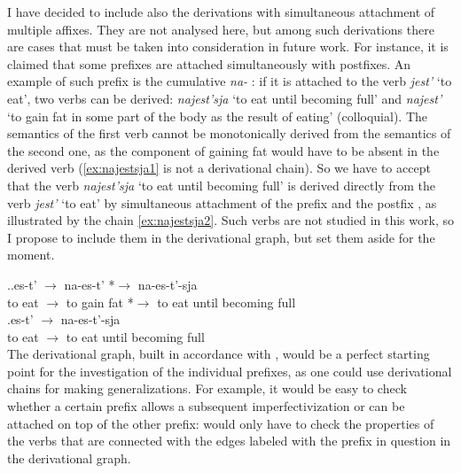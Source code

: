 I have decided to include also the derivations with simultaneous attachment of multiple affixes. They are not analysed here, but among such derivations there are cases that must be taken into consideration in future  work. For instance, it is claimed that some prefixes are attached simultaneously with postfixes. An example of such prefix is the cumulative  \textit{na-}  : if it is attached to the verb \textit{jest'} `to eat', two verbs can be derived: \textit{najest'sja} `to eat until becoming full' and \textit{najest'} `to gain fat in some part of the body as the result of eating' (colloquial). The semantics of the first verb cannot be  monotonically derived from the semantics of the second one, as the component of gaining fat would have to be absent in the derived verb (\ref{ex:najestsja1} is not a derivational chain). So we have to accept that the verb \textit{najest'sja} `to eat until becoming full' is derived directly from the verb \textit{jest'} `to eat' by simultaneous attachment of the prefix and the postfix , as illustrated by the chain \ref{ex:najestsja2}. Such verbs are not studied in this work, so I propose to include them in the derivational graph, but set them aside for the moment.
 
 \ex.\label{ex:najestsja}\ag.\label{ex:najestsja1}es-t'\textsuperscript{\IPF} $\rightarrow$ na-es-t'\textsuperscript{\PF} *$\rightarrow$ na-es-t'-sja\textsuperscript{\PF}\\	
{to eat} $\rightarrow$ {to gain fat} *$\rightarrow$ {to eat until becoming full}\\
\bg.\label{ex:najestsja2}es-t'\textsuperscript{\PF} $\rightarrow$ na-es-t'-sja\textsuperscript{\PF}\\
{to eat} $\rightarrow$ {to eat until becoming full}\\

The derivational graph, built in accordance with , would be a perfect starting point for the investigation of the individual prefixes, as one could use derivational chains for making generalizations. For example, it would be easy to check whether a certain prefix allows a subsequent imperfectivization  or can be attached on top of the other prefix: would only have to check the properties of the verbs that are connected with the edges labeled with the prefix in question in the derivational graph. 


